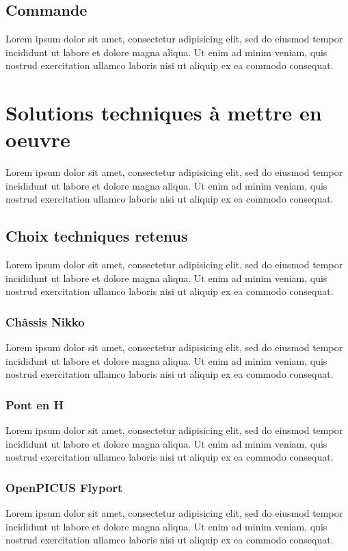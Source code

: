 \documentclass[a4paper,12pt]{report}
\begin{document}
		\subsection{Commande}
		Lorem ipsum dolor sit amet, consectetur adipisicing elit, sed do eiusmod tempor incididunt ut labore et dolore magna aliqua. Ut enim ad minim veniam, quis nostrud exercitation ullamco laboris nisi ut aliquip ex ea commodo consequat.
		
	\section{Solutions techniques à mettre en oeuvre}
	Lorem ipsum dolor sit amet, consectetur adipisicing elit, sed do eiusmod tempor incididunt ut labore et dolore magna aliqua. Ut enim ad minim veniam, quis nostrud exercitation ullamco laboris nisi ut aliquip ex ea commodo consequat.
	
		\subsection{Choix techniques retenus}
		Lorem ipsum dolor sit amet, consectetur adipisicing elit, sed do eiusmod tempor incididunt ut labore et dolore magna aliqua. Ut enim ad minim veniam, quis nostrud exercitation ullamco laboris nisi ut aliquip ex ea commodo consequat.
		
			\subsubsection{Châssis Nikko}
			Lorem ipsum dolor sit amet, consectetur adipisicing elit, sed do eiusmod tempor incididunt ut labore et dolore magna aliqua. Ut enim ad minim veniam, quis nostrud exercitation ullamco laboris nisi ut aliquip ex ea commodo consequat.
			
			\subsubsection{Pont en H}
			Lorem ipsum dolor sit amet, consectetur adipisicing elit, sed do eiusmod tempor incididunt ut labore et dolore magna aliqua. Ut enim ad minim veniam, quis nostrud exercitation ullamco laboris nisi ut aliquip ex ea commodo consequat.
			
			\subsubsection{OpenPICUS Flyport}
			Lorem ipsum dolor sit amet, consectetur adipisicing elit, sed do eiusmod tempor incididunt ut labore et dolore magna aliqua. Ut enim ad minim veniam, quis nostrud exercitation ullamco laboris nisi ut aliquip ex ea commodo consequat.
			
\end{document}
